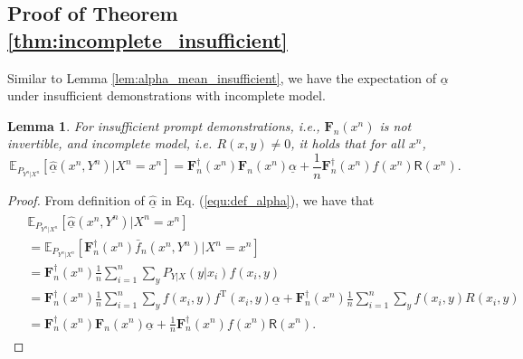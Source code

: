 \documentclass{article} %
\theoremstyle{plain} %
\newtheorem{lemma}[theorem]{Lemma}          %
\begin{document}
\subsection{Proof of Theorem \ref{thm:incomplete_insufficient}}\label{append:theorem3_proof}

Similar to Lemma \ref{lem:alpha_mean_insufficient}, we have the expectation of $\underline{\alpha}$ under insufficient demonstrations with incomplete model.
\begin{lemma}\label{lem:alpha_mean_incomplete_insufficient}
For insufficient prompt demonstrations, i.e., $\mathbf{F}_n(x^n)$ is not invertible, and incomplete model, i.e. $R(x,y)\neq 0$, it holds that for all $x^n$,
\begin{equation*}
    \mathbb{E}_{P_{Y^n|X^n}}[\underline{\hat{\alpha}}(x^n,Y^n) | X^n=x^n] = \mathbf{F}_n^{\dagger}(x^n)\mathbf{F}_n(x^n)\underline{\alpha} + \frac1n \mathbf{F}_n^{\dagger}(x^n) f(x^n) \mathsf{R}(x^n).
\end{equation*}
\end{lemma}
\begin{proof}
From definition of $\underline{\hat{\alpha}}$ in Eq. (\ref{equ:def_alpha}), we have that
\begin{align*}
\begin{aligned}
& \mathbb{E}_{P_{Y^n|X^n}}\left[ \underline{\hat{\alpha}}(x^n, Y^n) | X^n = x^n \right]\\ 
& = \mathbb{E}_{P_{Y^n|X^n}}\left[ \mathbf{F}_n^{\dagger}(x^n) \bar{f}_n(x^n,Y^n)  | X^n=x^n\right]\\
& = \mathbf{F}_n^{\dagger}(x^n)  \frac1n \sum_{i=1}^n \sum_y P_{Y\vert X}(y\vert x_i) f(x_i,y)\\
& = \mathbf{F}_n^{\dagger}(x^n) \frac1n\sum_{i=1}^n \sum_y f(x_i,y) f^\mathrm{T}(x_i,y) \underline{\alpha} + \mathbf{F}_n^{\dagger}(x^n)\frac1n\sum_{i=1}^n\sum_y f(x_i,y)R(x_i,y)\\
&=\mathbf{F}_n^{\dagger}(x^n)\mathbf{F}_n(x^n)\underline{\alpha}+ \frac1n \mathbf{F}_n^{\dagger}(x^n) f(x^n) \mathsf{R}(x^n).
\end{aligned}
\end{align*}
\end{proof}
\end{document}
